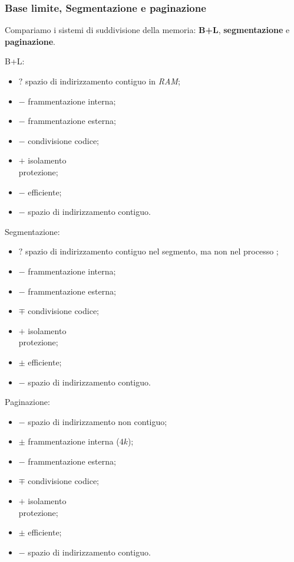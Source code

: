 \subsubsection{Base limite, Segmentazione e paginazione}
Compariamo i sistemi di suddivisione della memoria: \textbf{B+L}, \textbf{
segmentazione} e \textbf{paginazione}.

B+L:
\begin{itemize}
  \item $?$ spazio di indirizzamento contiguo in \emph{RAM};
  \item $-$ frammentazione interna;
  \item $-$ frammentazione esterna;
  \item $-$ condivisione codice;
  \item $+$ isolamento\\protezione;
  \item $-$ efficiente;
  \item $-$ spazio di indirizzamento contiguo.
\end{itemize}

Segmentazione:
\begin{itemize}
  \item $?$ spazio di indirizzamento contiguo nel segmento, ma non nel processo
    ;
  \item $-$ frammentazione interna;
  \item $-$ frammentazione esterna;
  \item $\mp$ condivisione codice;
  \item $+$ isolamento\\protezione;
  \item $\pm$ efficiente;
  \item $-$ spazio di indirizzamento contiguo.
\end{itemize}

Paginazione:
\begin{itemize}
  \item $-$ spazio di indirizzamento non contiguo;
  \item $\pm$ frammentazione interna ($4k$);
  \item $-$ frammentazione esterna;
  \item $\mp$ condivisione codice;
  \item $+$ isolamento\\protezione;
  \item $\pm$ efficiente;
  \item $-$ spazio di indirizzamento contiguo.
\end{itemize}
